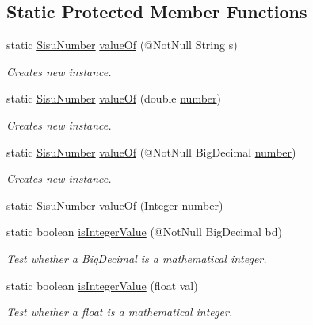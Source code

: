 \subsection*{Static Protected Member Functions}
\begin{DoxyCompactItemize}
\item 
static \hyperlink{classcom_1_1aarrelaakso_1_1drawl_1_1_sisu_number}{Sisu\+Number} \hyperlink{classcom_1_1aarrelaakso_1_1drawl_1_1_sisu_number_aa78b92a5f2ed2f598c6ba0775cbc2587}{value\+Of} (@Not\+Null String s)
\begin{DoxyCompactList}\small\item\em Creates new instance. \end{DoxyCompactList}\item 
static \hyperlink{classcom_1_1aarrelaakso_1_1drawl_1_1_sisu_number}{Sisu\+Number} \hyperlink{classcom_1_1aarrelaakso_1_1drawl_1_1_sisu_number_aab56528a184c765d49d9e86f2160c1fa}{value\+Of} (double \hyperlink{classcom_1_1aarrelaakso_1_1drawl_1_1_sisu_number_a5741c4131458787e3adb0bfe649d7758}{number})
\begin{DoxyCompactList}\small\item\em Creates new instance. \end{DoxyCompactList}\item 
static \hyperlink{classcom_1_1aarrelaakso_1_1drawl_1_1_sisu_number}{Sisu\+Number} \hyperlink{classcom_1_1aarrelaakso_1_1drawl_1_1_sisu_number_a04be5a20a778dce44af12645b2d6bbc9}{value\+Of} (@Not\+Null Big\+Decimal \hyperlink{classcom_1_1aarrelaakso_1_1drawl_1_1_sisu_number_a5741c4131458787e3adb0bfe649d7758}{number})
\begin{DoxyCompactList}\small\item\em Creates new instance. \end{DoxyCompactList}\item 
static \hyperlink{classcom_1_1aarrelaakso_1_1drawl_1_1_sisu_number}{Sisu\+Number} \hyperlink{classcom_1_1aarrelaakso_1_1drawl_1_1_sisu_number_accb397fda90ea57fefeab7da195d4dd0}{value\+Of} (Integer \hyperlink{classcom_1_1aarrelaakso_1_1drawl_1_1_sisu_number_a5741c4131458787e3adb0bfe649d7758}{number})
\item 
static boolean \hyperlink{classcom_1_1aarrelaakso_1_1drawl_1_1_sisu_number_a5498719e0995688d6462e6184f53094d}{is\+Integer\+Value} (@Not\+Null Big\+Decimal bd)
\begin{DoxyCompactList}\small\item\em Test whether a Big\+Decimal is a mathematical integer. \end{DoxyCompactList}\item 
static boolean \hyperlink{classcom_1_1aarrelaakso_1_1drawl_1_1_sisu_number_ab681f2c8e768f0557e6e3bca795fc135}{is\+Integer\+Value} (float val)
\begin{DoxyCompactList}\small\item\em Test whether a float is a mathematical integer. \end{DoxyCompactList}\end{DoxyCompactItemize}
